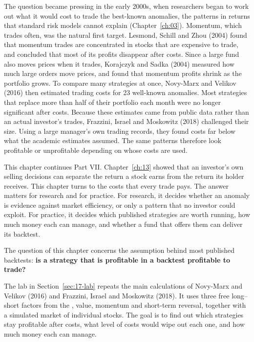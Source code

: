 The question became pressing in the early 2000s, when researchers began to work out what it would cost to trade the best-known anomalies, the patterns in returns that standard risk models cannot explain (Chapter~\ref{ch:03}). Momentum, which trades often, was the natural first target. Lesmond, Schill and Zhou (2004) found that momentum trades are concentrated in stocks that are expensive to trade, and concluded that most of its profits disappear after costs. Since a large fund also moves prices when it trades, Korajczyk and Sadka (2004) measured how much large orders move prices, and found that momentum profits shrink as the portfolio grows. To compare many strategies at once, Novy-Marx and Velikov (2016) then estimated trading costs for 23 well-known anomalies. Most strategies that replace more than half of their portfolio each month were no longer significant after costs. Because these estimates came from public data rather than an actual investor's trades, Frazzini, Israel and Moskowitz (2018) challenged their size. Using a large manager's own trading records, they found costs far below what the academic estimates assumed. The same patterns therefore look profitable or unprofitable depending on whose costs are used.

This chapter continues Part VII. Chapter~\ref{ch:13} showed that an investor's own selling decisions can separate the return a stock earns from the return its holder receives. This chapter turns to the costs that every trade pays. The answer matters for research and for practice. For research, it decides whether an anomaly is evidence against market efficiency, or only a pattern that no investor could exploit. For practice, it decides which published strategies are worth running, how much money each can manage, and whether a fund that offers them can deliver its backtest. 

The question of this chapter concerns the assumption behind most published backtests: \textbf{is a strategy that is profitable in a backtest profitable to trade?}

The lab in Section~\ref{sec:17-lab} repeats the main calculations of Novy-Marx and Velikov (2016) and Frazzini, Israel and Moskowitz (2018). It uses three free long--short factors from the , value, momentum and short-term reversal, together with a simulated market of individual stocks. The goal is to find out which strategies stay profitable after costs, what level of costs would wipe out each one, and how much money each can manage.


